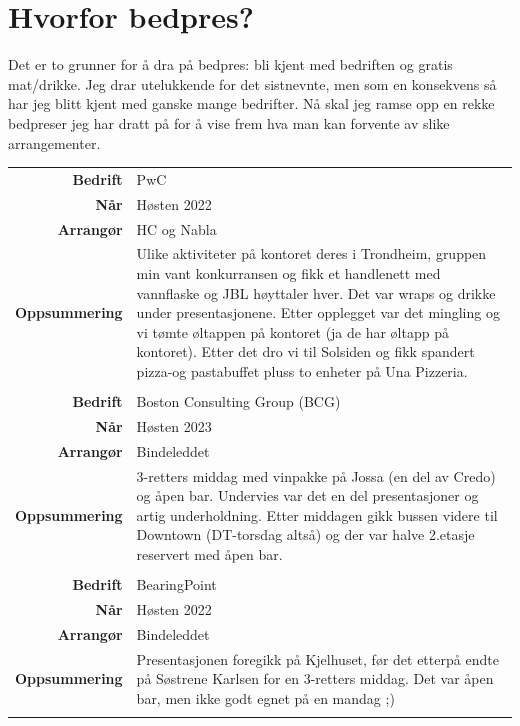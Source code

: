 \section{Hvorfor bedpres?}

Det er to grunner for å dra på bedpres: bli kjent med bedriften og gratis mat/drikke. Jeg drar utelukkende for det sistnevnte, men som en konsekvens så har jeg blitt kjent med ganske mange bedrifter. Nå skal jeg ramse opp en rekke bedpreser jeg har dratt på for å vise frem hva man kan forvente av slike arrangementer.

\begin{table}[H]
    \centering
    \begin{tabular}{r p{10cm}}
        \textbf{Bedrift} & PwC \\
        \textbf{Når} & Høsten 2022\\
        \textbf{Arrangør} & HC og Nabla\\
        \textbf{Oppsummering} & Ulike aktiviteter på kontoret deres i Trondheim, gruppen min vant konkurransen og fikk et handlenett med vannflaske og JBL høyttaler hver. Det var wraps og drikke under presentasjonene. Etter opplegget var det mingling og vi tømte øltappen på kontoret (ja de har øltapp på kontoret). Etter det dro vi til Solsiden og fikk spandert pizza-og pastabuffet pluss to enheter på Una Pizzeria.\\
        & \\
        \textbf{Bedrift} & Boston Consulting Group (BCG)\\
        \textbf{Når} & Høsten 2023\\
        \textbf{Arrangør} & Bindeleddet\\
        \textbf{Oppsummering} & 3-retters middag med vinpakke på Jossa (en del av Credo) og åpen bar. Undervies var det en del presentasjoner og artig underholdning. Etter middagen gikk bussen videre til Downtown (DT-torsdag altså) og der var halve 2.etasje reservert med åpen bar.\\
        & \\
        \textbf{Bedrift} &  BearingPoint\\
        \textbf{Når} & Høsten 2022\\
        \textbf{Arrangør} & Bindeleddet\\
        \textbf{Oppsummering} & Presentasjonen foregikk på Kjelhuset, før det etterpå endte på Søstrene Karlsen for en 3-retters middag. Det var åpen bar, men ikke godt egnet på en mandag ;)\\
        & \\

\end{tabular}
\end{table}
